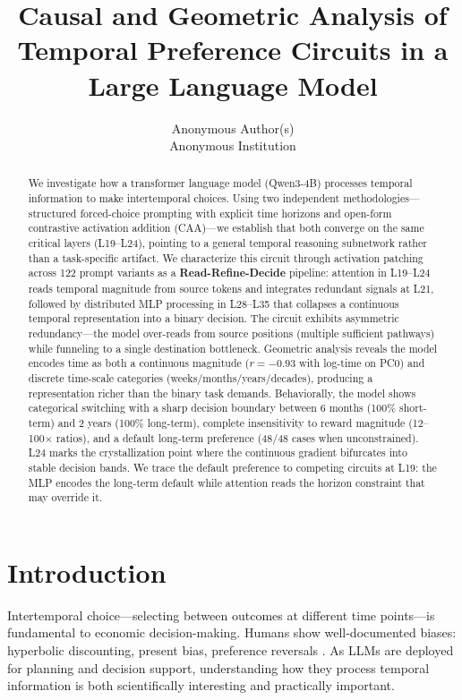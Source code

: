 \documentclass{article}
\title{Causal and Geometric Analysis of Temporal Preference Circuits in a Large Language Model}
\author{%
  Anonymous Author(s) \\
  Anonymous Institution \\
}
\begin{document}
\maketitle

\begin{abstract}
We investigate how a transformer language model (Qwen3-4B) processes temporal information to make intertemporal choices. Using two independent methodologies---structured forced-choice prompting with explicit time horizons and open-form contrastive activation addition (CAA)---we establish that both converge on the same critical layers (L19--L24), pointing to a general temporal reasoning subnetwork rather than a task-specific artifact. We characterize this circuit through activation patching across 122 prompt variants as a \textbf{Read-Refine-Decide} pipeline: attention in L19--L24 reads temporal magnitude from source tokens and integrates redundant signals at L21, followed by distributed MLP processing in L28--L35 that collapses a continuous temporal representation into a binary decision. The circuit exhibits asymmetric redundancy---the model over-reads from source positions (multiple sufficient pathways) while funneling to a single destination bottleneck. Geometric analysis reveals the model encodes time as both a continuous magnitude ($r = -0.93$ with log-time on PC0) and discrete time-scale categories (weeks/months/years/decades), producing a representation richer than the binary task demands. Behaviorally, the model shows categorical switching with a sharp decision boundary between 6 months (100\% short-term) and 2 years (100\% long-term), complete insensitivity to reward magnitude (12--100$\times$ ratios), and a default long-term preference (48/48 cases when unconstrained). L24 marks the crystallization point where the continuous gradient bifurcates into stable decision bands. We trace the default preference to competing circuits at L19: the MLP encodes the long-term default while attention reads the horizon constraint that may override it.
\end{abstract}

\section{Introduction}

Intertemporal choice---selecting between outcomes at different time points---is fundamental to economic decision-making. Humans show well-documented biases: hyperbolic discounting, present bias, preference reversals \citep{laibson1997golden, frederick2002time}. As LLMs are deployed for planning and decision support, understanding how they process temporal information is both scientifically interesting and practically important.
\end{document}
